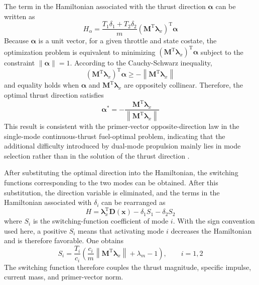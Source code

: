 ﻿\documentclass{IEEEtaes}
\begin{document}
The term in the Hamiltonian associated with the thrust direction $\bm{\alpha}$ can be written as
\begin{equation}
H_{\alpha}=\frac{T_1\delta_1+T_2\delta_2}{m}\left(\bm{M}^{\mathrm{T}}\bm{\lambda}_x\right)^{\mathrm{T}}\bm{\alpha}
\end{equation}
Because $\bm{\alpha}$ is a unit vector, for a given throttle and state costate, the optimization problem is equivalent to minimizing $\left(\bm{M}^{\mathrm{T}}\bm{\lambda}_x\right)^{\mathrm{T}}\bm{\alpha}$ subject to the constraint $\|\bm{\alpha}\|=1$. According to the Cauchy-Schwarz inequality,
\begin{equation}
\left(\bm{M}^{\mathrm{T}}\bm{\lambda}_x\right)^{\mathrm{T}}\bm{\alpha}\geq-\left\|\bm{M}^{\mathrm{T}}\bm{\lambda}_x\right\|
\end{equation}
and equality holds when $\bm{\alpha}$ and $\bm{M}^{\mathrm{T}}\bm{\lambda}_x$ are oppositely collinear. Therefore, the optimal thrust direction satisfies
\begin{equation}
\bm{\alpha}^{*}=-\frac{\bm{M}^{\mathrm{T}}\bm{\lambda}_x}{\left\|\bm{M}^{\mathrm{T}}\bm{\lambda}_x\right\|}
\end{equation}
This result is consistent with the primer-vector opposite-direction law in the single-mode continuous-thrust fuel-optimal problem, indicating that the additional difficulty introduced by dual-mode propulsion mainly lies in mode selection rather than in the solution of the thrust direction \cite{chi2022,taheri2020a,cline2024a}.

After substituting the optimal direction into the Hamiltonian, the switching functions corresponding to the two modes can be obtained. After this substitution, the direction variable is eliminated, and the terms in the Hamiltonian associated with $\delta_i$ can be rearranged as
\begin{equation}
H=\bm{\lambda}_x^{\mathrm{T}}\bm{D}(\bm{x})-\delta_1S_1-\delta_2S_2
\end{equation}
where $S_i$ is the switching-function coefficient of mode $i$. With the sign convention used here, a positive $S_i$ means that activating mode $i$ decreases the Hamiltonian and is therefore favorable. One obtains
\begin{equation}
S_i=\frac{T_i}{c_i}\left(\frac{c_i}{m}\left\|\bm{M}^{\mathrm{T}}\bm{\lambda}_x\right\|+\lambda_m-1\right),\qquad i=1,2
\end{equation}
The switching function therefore couples the thrust magnitude, specific impulse, current mass, and primer-vector norm.
\end{document}
